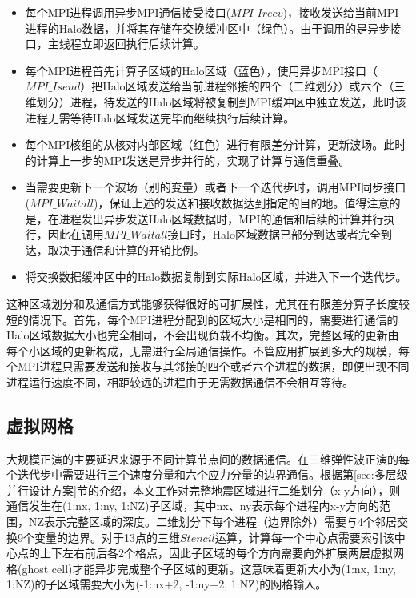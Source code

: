 \begin{itemize}
  \item 每个MPI进程调用异步MPI通信接受接口($MPI\_Irecv$)，接收发送给当前MPI进程的Halo数据，并将其存储在交换缓冲区中（绿色）。由于调用的是异步接口，主线程立即返回执行后续计算。
  \item 每个MPI进程首先计算子区域的Halo区域（蓝色），使用异步MPI接口（$MPI\_Isend$）把Halo区域发送给当前进程邻接的四个（二维划分）或六个（三维划分）进程，待发送的Halo区域将被复制到MPI缓冲区中独立发送，此时该进程无需等待Halo区域发送完毕而继续执行后续计算。
  \item 每个MPI核组的从核对内部区域（红色）进行有限差分计算，更新波场。此时的计算上一步的MPI发送是异步并行的，实现了计算与通信重叠。
  \item 当需要更新下一个波场（别的变量）或者下一个迭代步时，调用MPI同步接口($MPI\_Waitall$)，保证上述的发送和接收数据达到指定的目的地。值得注意的是，在进程发出异步发送Halo区域数据时，MPI的通信和后续的计算并行执行，因此在调用$MPI\_Waitall$接口时，Halo区域数据已部分到达或者完全到达，取决于通信和计算的开销比例。
  \item 将交换数据缓冲区中的Halo数据复制到实际Halo区域，并进入下一个迭代步。
\end{itemize}

这种区域划分和及通信方式能够获得很好的可扩展性，尤其在有限差分算子长度较短的情况下。首先，每个MPI进程分配到的区域大小是相同的，需要进行通信的Halo区域数据大小也完全相同，不会出现负载不均衡。其次，完整区域的更新由每个小区域的更新构成，无需进行全局通信操作。不管应用扩展到多大的规模，每个MPI进程只需要发送和接收与其邻接的四个或者六个进程的数据，即便出现不同进程运行速度不同，相距较远的进程由于无需数据通信不会相互等待。

\subsection{虚拟网格}

大规模正演的主要延迟来源于不同计算节点间的数据通信。在三维弹性波正演的每个迭代步中需要进行三个速度分量和六个应力分量的边界通信。根据第\ref{sec:多层级并行设计方案}节的介绍，本文工作对完整地震区域进行二维划分（x-y方向），则通信发生在(1:nx, 1:ny, 1:NZ)子区域，其中nx、ny表示每个进程内x-y方向的范围，NZ表示完整区域的深度。二维划分下每个进程（边界除外）需要与4个邻居交换9个变量的边界。对于13点的三维$Stencil$运算，计算每一个中心点需要索引该中心点的上下左右前后各2个格点，因此子区域的每个方向需要向外扩展两层虚拟网格(ghost cell)才能异步完成整个子区域的更新。这意味着更新大小为(1:nx, 1:ny, 1:NZ)的子区域需要大小为(-1:nx+2, -1:ny+2, 1:NZ)的网格输入。

